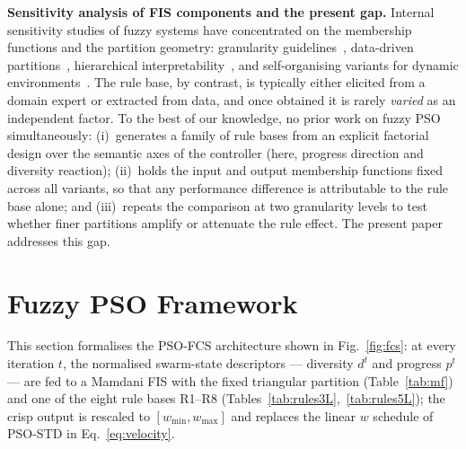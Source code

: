 \documentclass[runningheads]{llncs}
\begin{document}
\textbf{Sensitivity analysis of FIS components and the present gap.} Internal sensitivity studies of fuzzy systems have concentrated on the membership functions and the partition geometry: granularity guidelines~\cite{cordon2000}, data-driven partitions~\cite{guillaume2004}, hierarchical interpretability~\cite{magdalena2019}, and self-organising variants for dynamic environments~\cite{bai2022}. The rule base, by contrast, is typically either elicited from a domain expert or extracted from data, and once obtained it is rarely \emph{varied} as an independent factor. To the best of our knowledge, no prior work on fuzzy PSO simultaneously: (i)~generates a family of rule bases from an explicit factorial design over the semantic axes of the controller (here, progress direction and diversity reaction); (ii)~holds the input and output membership functions fixed across all variants, so that any performance difference is attributable to the rule base alone; and (iii)~repeats the comparison at two granularity levels to test whether finer partitions amplify or attenuate the rule effect. The present paper addresses this gap.

\section{Fuzzy PSO Framework}\label{sec:framework}

This section formalises the PSO-FCS architecture shown in Fig.~\ref{fig:fcs}: at every iteration $t$, the normalised swarm-state descriptors --- diversity $d^{t}$ and progress $p^{t}$ --- are fed to a Mamdani FIS with the fixed triangular partition (Table~\ref{tab:mf}) and one of the eight rule bases R1--R8 (Tables~\ref{tab:rules3L},~\ref{tab:rules5L}); the crisp output is rescaled to $[w_{\min},w_{\max}]$ and replaces the linear $w$ schedule of PSO-STD in Eq.~\eqref{eq:velocity}.


\end{document}

